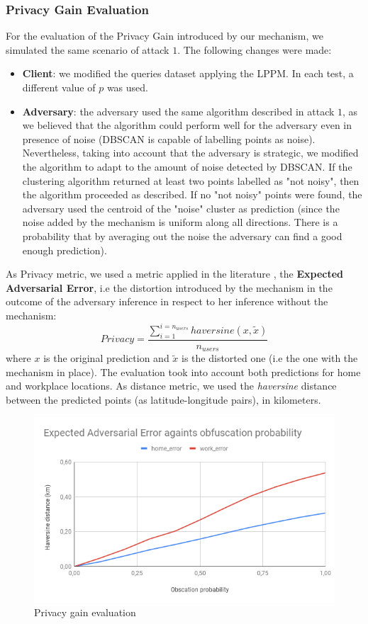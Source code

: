 \documentclass[10pt,conference,compsocconf]{IEEEtran}
\begin{document}
\subsubsection{Privacy Gain Evaluation}
For the evaluation of the Privacy Gain introduced by our mechanism, we simulated
the same scenario of attack $1$. The following changes were made:
\begin{itemize}
    \item \textbf{Client}: we modified the queries dataset applying the LPPM. In
    each test, a different value of $p$ was used.
    \item \textbf{Adversary}: the adversary used the same algorithm described in
    attack $1$, as we believed that the algorithm could perform well for the
    adversary even in presence of noise (DBSCAN is capable of labelling points
    as noise). Nevertheless, taking into account that the adversary is
    strategic, we modified the algorithm to adapt to the amount of noise
    detected by DBSCAN. If the clustering algorithm returned at least two points
    labelled as "not noisy", then the algorithm proceeded as described. If no
    "not noisy" points were found, the adversary used the centroid of the
    "noise" cluster as prediction (since the noise added by the mechanism is
    uniform along all directions. There is a probability that by
    averaging out the noise the adversary can find a good enough prediction).
\end{itemize}
As Privacy metric, we used a metric applied in the literature \cite{Shokri}, the
\textbf{Expected Adversarial Error}, i.e the distortion introduced by the
mechanism in the outcome of the adversary inference in respect to her inference
without the mechanism:
\[Privacy = \frac{\sum_{i=1}^{i=n_{users}}haversine(x, \tilde{x})}{n_{users}}\] where $x$ is the
original prediction and $\tilde{x}$ is the distorted one (i.e the one with the mechanism in place). The evaluation took
into account both predictions for home and workplace locations. As distance
metric, we used the \textit{haversine} distance between the predicted points (as
latitude-longitude pairs), in kilometers.
    \begin{figure}[h!]
        \centering
        \includegraphics[width=0.6\linewidth]{adv_error.png}
        \caption{Privacy gain evaluation}
    \end{figure}
\end{document}
